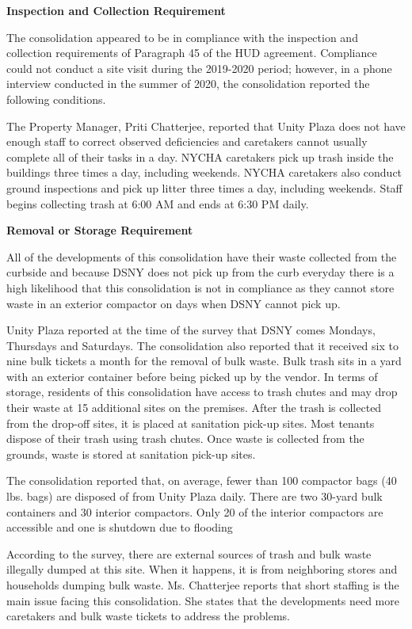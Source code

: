 
\textbf{Inspection and Collection Requirement}

The consolidation appeared to be in compliance with the inspection and collection requirements of Paragraph 45 of the HUD agreement. Compliance could not conduct a site visit during the 2019-2020 period; however, in a phone interview conducted in the summer of 2020, the consolidation reported the following conditions.

The Property Manager, Priti Chatterjee, reported that Unity Plaza does not have enough staff to correct observed deficiencies and caretakers cannot usually complete all of their tasks in a day. NYCHA caretakers pick up trash inside the buildings three times a day, including weekends. NYCHA caretakers also conduct ground inspections and pick up litter three times a day, including weekends. Staff begins collecting trash at 6:00 AM and ends at 6:30 PM daily. 

\textbf{Removal or Storage Requirement}

All of the developments of this consolidation have their waste collected from the curbside and because DSNY does not pick up from the curb everyday there is a high likelihood that this consolidation is not in compliance as they cannot store waste in an exterior compactor on days when DSNY cannot pick up.

Unity Plaza reported at the time of the survey that DSNY comes Mondays, Thursdays and Saturdays. The consolidation also reported that it received six to nine bulk tickets a month for the removal of bulk waste. Bulk trash sits in a yard with an exterior container before being picked up by the vendor. In terms of storage, residents of this consolidation have access to trash chutes and may drop their waste at 15 additional sites on the premises. After the trash is collected from the drop-off sites, it is placed at sanitation pick-up sites. Most tenants dispose of their trash using trash chutes. Once waste is collected from the grounds, waste is stored at sanitation pick-up sites.

The consolidation reported that, on average, fewer than 100 compactor bags (40 lbs. bags) are disposed of from Unity Plaza daily. There are two 30-yard bulk containers and 30 interior compactors. Only 20 of the interior compactors are accessible and one is shutdown due to flooding

According to the survey, there are external sources of trash and bulk waste illegally dumped at this site. When it happens, it is from neighboring stores and households dumping bulk waste. Ms. Chatterjee reports that short staffing is the main issue facing this consolidation. She states that the developments need more caretakers and bulk waste tickets to address the problems.